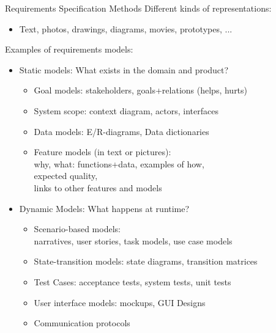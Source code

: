 \documentclass{beamer}
\begin{document}
\begin{frame}[fragile]{Requirements Specification Methods}
Different kinds of representations:
\begin{itemize}
\item Text, photos, drawings, diagrams, movies, prototypes, ...
\end{itemize}
Examples of requirements models:
\begin{itemize}
\item Static models: What exists in the domain and product?
\begin{itemize}
\item Goal models: stakeholders, goals+relations (helps, hurts)
\item System scope: context diagram, actors, interfaces
\item Data models: E/R-diagrams, Data dictionaries
\item Feature models (in text or pictures):\\why, what: functions+data, examples of how,\\expected quality,\\links to other features and models
\end{itemize}
\item Dynamic Models: What happens at runtime?
\begin{itemize}
\item Scenario-based models:\\narratives, user stories, task models, use case models
\item State-transition models: state diagrams, transition matrices
\item Test Cases: acceptance tests, system tests, unit tests
\item User interface models: mockups, GUI Designs
\item Communication protocols
\end{itemize}
\end{itemize}
\end{frame}
\end{document}
